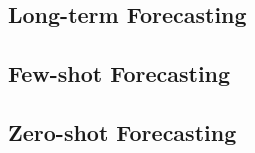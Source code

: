 \newpage
\subsection{Long-term Forecasting}
\label{appx:long_term_details}


\newpage
\subsection{Few-shot Forecasting}
\label{appx:few_shot_details}



\subsection{Zero-shot Forecasting}
\label{appx:zero_shot_details}



